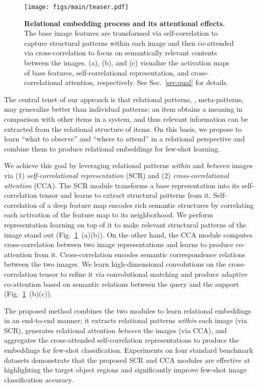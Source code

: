 \documentclass[10pt,twocolumn,letterpaper]{article}
\begin{document}
\begin{figure}[t!]
	\centering
	\small
    \texttt{[image: figs/main/teaser.pdf]}
	\caption{
    \textbf{Relational embedding process and its attentional effects.} 
    The base image features are transformed via self-correlation to capture structural patterns within each image and then co-attended via cross-correlation to focus on semantically relevant contents between the images.
    (a), (b), and (c) visualize the activation maps of base features, self-correlational representation, and cross-correlational attention, respectively. See Sec.~\ref{sec:qual} for details. 
	}
\label{fig:teaser}
\vspace{-4mm}
\end{figure}

The central tenet of our approach is that relational patterns, \ie, meta-patterns, may generalize better than individual patterns; an item obtains a meaning in comparison with  other items in a system, and thus relevant information can be extracted from the relational structure of items. On this basis, we propose to learn ``what to observe'' and ``where to attend'' in a relational perspective and combine them to produce relational embeddings for few-shot learning.

We achieve this goal by leveraging relational patterns {\em within} and {\em between} images via (1) {\em self-correlational representation} (SCR) and (2) {\em cross-correlational attention} (CCA).
The SCR module transforms a base representation into its self-correlation tensor and learns to extract structural patterns from it. 
Self-correlation of a deep feature map encodes rich semantic structures by correlating each activation of the feature map to its neighborhood. We perform representation learning on top of it to make relevant structural patterns of the image stand out (Fig.~\ref{fig:teaser}~(a)(b)).
On the other hand, the CCA module computes cross-correlation between two image representations and learns to produce co-attention from it. 
Cross-correlation encodes semantic correspondence relations between the two images. 
We learn high-dimensional convolutions on the cross-correlation tensor to refine it via convolutional matching and produce adaptive co-attention based on semantic relations between the query and the support (Fig.~\ref{fig:teaser}~(b)(c)).


The proposed method combines the two modules to learn relational embeddings in an end-to-end manner; it extracts relational patterns {\em within} each image (via SCR), generates relational attention {\em between} the images (via CCA), and aggregates the cross-attended self-correlation representations to produce the embeddings for few-shot classification.
Experiments on four standard benchmark datasets demonstrate that the proposed SCR and CCA modules are effective at highlighting the target object regions and significantly improve few-shot image classification accuracy.
\end{document}
